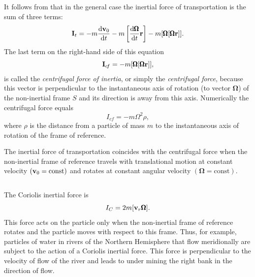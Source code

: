 \subsection{}\label{7.2.3} It follows from  that in the general case the inertial force of transportation is the sum of three terms:
\begin{equation*}%
\vb{I}_{t} = -m \dv{\vb{v}_{0}}{t} - m \left[ \dv{\pmb{\Omega}}{t} \vb{r} \right] - m\qty[\pmb{\Omega}[\pmb{\Omega}\vb{r}]].
\end{equation*}
The last term on the right-hand side of this equation
\begin{equation*}%
\vb{I}_{c\!f} = - m\qty[\pmb{\Omega}[\pmb{\Omega}\vb{r}]],
\end{equation*}
is called the \emph{centrifugal force of inertia}, or simply the \emph{centrifugal force}, because this vector is perpendicular to the instantaneous axis of rotation (to vector $\pmb{\Omega}$) of the non-inertial frame $S$ and its direction is away from this axis. Numerically the centri­fugal force equals
\begin{equation*}%
I_{c\!f} = - m\Omega^{2} \rho,
\end{equation*}
where $\rho$ is the distance from a particle of mass $m$ to the instan­taneous axis of rotation of the frame of reference.

The inertial force of transportation coincides with the centri­fugal force when the non-inertial frame of reference travels with translational motion at constant velocity $(\vb{v}_{0} = \textrm{const})$ and rotates at constant angular velocity $(\pmb{\Omega} = \textrm{const})$.

\subsection{}\label{7.2.4} The Coriolis inertial force is 
\begin{equation*}%
I_{C} = 2 m \qty[\vb{v}_{r}\pmb{\Omega}].
\end{equation*}
This force acts on the particle only when the non-inertial frame of reference rotates and the particle moves with respect to this frame. Thus, for example, particles of water in rivers of the Northern Hemisphere that flow meridionally are subject to the action of a Coriolis inertial force. This force is perpen­dicular to the velocity of flow of the river and leads to under­ mining the right bank in the direction of flow.


